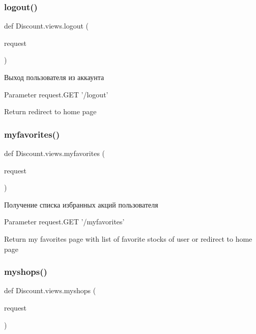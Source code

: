 \subsubsection{\texorpdfstring{logout()}{logout()}}
{\footnotesize\ttfamily def Discount.\+views.\+logout (\begin{DoxyParamCaption}\item[{}]{request }\end{DoxyParamCaption})}

\begin{DoxyVerb}Выход пользователя из аккаунта

Parameter
    request.GET '/logout'

Return
    redirect to home page
\end{DoxyVerb}
 \mbox{\label{namespace_discount_1_1views_a0c55e16270014f1b56d16dc55c116c3d}} 
\subsubsection{\texorpdfstring{myfavorites()}{myfavorites()}}
{\footnotesize\ttfamily def Discount.\+views.\+myfavorites (\begin{DoxyParamCaption}\item[{}]{request }\end{DoxyParamCaption})}

\begin{DoxyVerb}Получение списка избранных акций пользователя

Parameter
    request.GET '/myfavorites'

Return
    my favorites page with list of favorite stocks of user
    or
    redirect to home page
\end{DoxyVerb}
 \mbox{\label{namespace_discount_1_1views_a8e05c2613033ea5883a63ce9422bb09e}} 
\subsubsection{\texorpdfstring{myshops()}{myshops()}}
{\footnotesize\ttfamily def Discount.\+views.\+myshops (\begin{DoxyParamCaption}\item[{}]{request }\end{DoxyParamCaption})}

